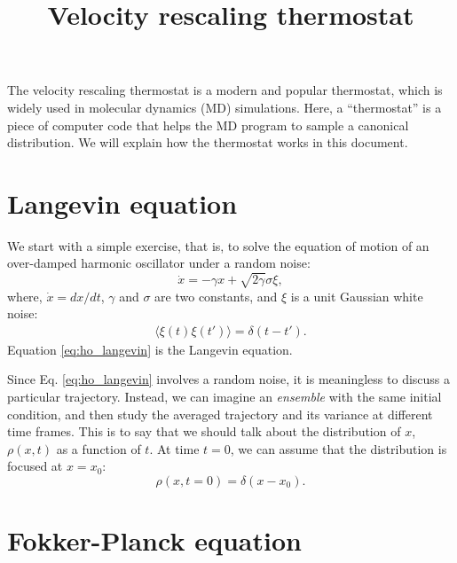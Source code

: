\documentclass[11pt]{article}
\begin{document}
\title{ Velocity rescaling thermostat }
\author{ \vspace{-10ex} }
\date{ \vspace{-10ex} }
\maketitle



The velocity rescaling thermostat is a modern and popular thermostat,
which is widely used in molecular dynamics (MD) simulations.
%
Here, a ``thermostat'' is a piece of computer code
that helps the MD program to sample a canonical distribution.
%
We will explain how the thermostat works in this document.



\section{Langevin equation}



We start with a simple exercise,
that is, to solve the equation of motion
of an over-damped harmonic oscillator
under a random noise:
%
\begin{equation}
  \dot x = -\gamma x + \sqrt{ 2 \gamma } \sigma \xi,
  \label{eq:ho_langevin}
\end{equation}
where,
$\dot x = dx/dt$,
$\gamma$ and $\sigma$ are two constants,
and $\xi$ is a unit Gaussian white noise:
\begin{align}
  \langle \xi(t) \xi(t') \rangle
=
  \delta(t - t').
\end{align}
Equation \eqref{eq:ho_langevin} is the Langevin equation.

Since Eq. \eqref{eq:ho_langevin} involves a random noise,
it is meaningless to discuss a particular trajectory.
%
Instead, we can imagine an \emph{ensemble} with the same initial condition,
and then study the averaged trajectory
and its variance at different time frames.
%
This is to say that we should talk about the distribution
of $x$, $\rho(x, t)$ as a function of $t$.
%
At time $t = 0$, we can assume that the distribution
is focused at $x = x_0$:
%
\begin{equation}
  \rho(x, t = 0) = \delta(x - x_0).
  \label{eq:rho_t0}
\end{equation}



\section{Fokker-Planck equation}
\end{document}

